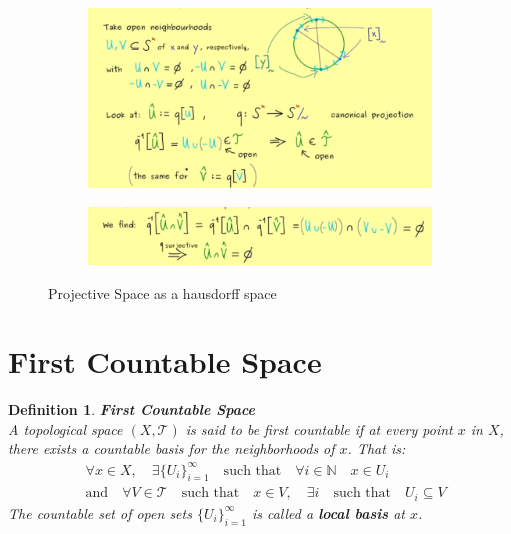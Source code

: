 \documentclass[11pt]{book} %
\newtheorem{definition}{Definition}[section]
\begin{document}
\begin{figure}[H]
    \begin{subfigure}{\textwidth}
        \centering
        \includegraphics[width=\textwidth]{Figs/projective_space_is_hausdorff.png}
    \end{subfigure}
    \begin{subfigure}{\textwidth}
        \centering
        \includegraphics[width=\textwidth]{Figs/projective_space_is_hausdorff2.png}
    \end{subfigure}
    \caption{Projective Space as a hausdorff space}
\end{figure}


\section{First Countable Space}

\begin{definition}{\textbf{First Countable Space}} \\
    A topological space \( (X , \mathcal{T}) \) is said to be \emph{first countable} if at every point \( x \) in \( X \), 
    there exists a countable basis for the neighborhoods of \( x \). That is: \\ 
    \begin{align*}
        &\forall x \in X, \quad \exists \{ U_i \}_{i=1}^{\infty} \quad \text{such that} \quad \forall i \in \mathbb{N} \quad x \in U_i \\
        &\text{and} \quad \forall V \in \mathcal{T} \quad \text{such that} \quad x \in V , \quad \exists i \quad \text{such that} \quad U_i \subseteq V
    \end{align*}
    The countable set of open sets \( \{ U_i \}_{i=1}^{\infty} \) is called a \textbf{local basis} at \( x \).
\end{definition}
\end{document}
